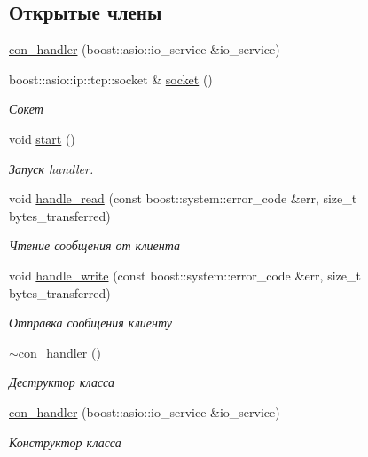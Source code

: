 \subsection*{Открытые члены}
\begin{DoxyCompactItemize}
\item 
\mbox{\hyperlink{classcon__handler_a18e7e450430ebe71687a0fd0c79507aa}{con\+\_\+handler}} (boost\+::asio\+::io\+\_\+service \&io\+\_\+service)
\item 
boost\+::asio\+::ip\+::tcp\+::socket \& \mbox{\hyperlink{group__con__handler__cpp_gad168c799678add9fb23f3379e1d42b22}{socket}} ()
\begin{DoxyCompactList}\small\item\em Сокет \end{DoxyCompactList}\item 
void \mbox{\hyperlink{group__con__handler__cpp_ga02d6691e226a75525a2ac83062b5c7f7}{start}} ()
\begin{DoxyCompactList}\small\item\em Запуск handler. \end{DoxyCompactList}\item 
void \mbox{\hyperlink{group__con__handler__cpp_ga3b8e9edfc8fed79fcba0242a58b54bc2}{handle\+\_\+read}} (const boost\+::system\+::error\+\_\+code \&err, size\+\_\+t bytes\+\_\+transferred)
\begin{DoxyCompactList}\small\item\em Чтение сообщения от клиента \end{DoxyCompactList}\item 
void \mbox{\hyperlink{group__con__handler__cpp_ga10169d7b3588adb849d7e7c02c46375a}{handle\+\_\+write}} (const boost\+::system\+::error\+\_\+code \&err, size\+\_\+t bytes\+\_\+transferred)
\begin{DoxyCompactList}\small\item\em Отправка сообщения клиенту \end{DoxyCompactList}\item 
\mbox{\hyperlink{group__con__handler__cpp_gaa1bc82c764eb633355a52bd77689ed3f}{$\sim$con\+\_\+handler}} ()
\begin{DoxyCompactList}\small\item\em Деструктор класса \end{DoxyCompactList}\item 
\mbox{\hyperlink{classcon__handler_a18e7e450430ebe71687a0fd0c79507aa}{con\+\_\+handler}} (boost\+::asio\+::io\+\_\+service \&io\+\_\+service)
\begin{DoxyCompactList}\small\item\em Конструктор класса \end{DoxyCompactList}\item 

\end{DoxyCompactItemize}
